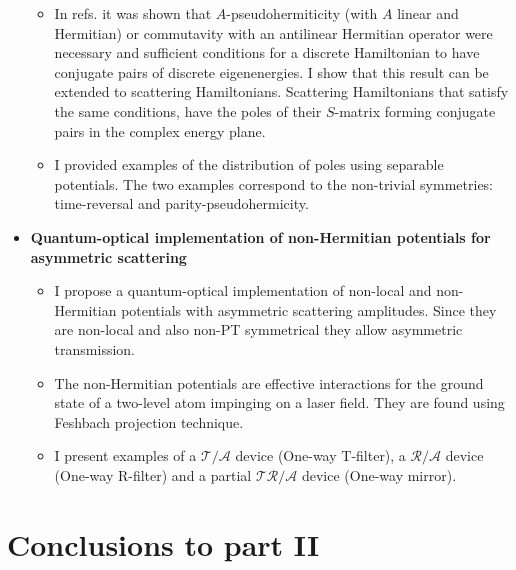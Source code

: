 \begin{itemize}
\begin{itemize}
    \item In refs. \cite{Mostafazadeh2002,Mostafazadeh2002a,Mostafazadeh2002b} it was shown that
    $A$-pseudohermiticity (with $A$ linear and Hermitian) or commutavity with an antilinear Hermitian operator were necessary and sufficient conditions for a discrete Hamiltonian to have conjugate pairs of discrete eigenenergies. I show that this result can be extended to scattering Hamiltonians. Scattering Hamiltonians that satisfy the same conditions, have the poles of their $S$-matrix forming conjugate pairs in the complex energy plane.

    \item I provided examples of the distribution of poles using separable potentials. The two examples correspond to the non-trivial symmetries: time-reversal and parity-pseudohermicity.

  \end{itemize}

  \item {\bf Quantum-optical implementation of non-Hermitian potentials for asymmetric scattering}
  \begin{itemize}
    \item I propose a quantum-optical implementation of non-local and non-Hermitian potentials
    with asymmetric scattering amplitudes. Since they are non-local and also non-PT symmetrical they allow asymmetric transmission.

    \item The non-Hermitian potentials are effective interactions for the ground state of a two-level atom impinging on a laser field. They are found using Feshbach projection technique.

    \item I present examples of a $\mathcal{T/A}$ device (One-way T-filter), a $\mathcal{R/A}$ device (One-way R-filter) and a partial $\mathcal{TR/A}$ device (One-way mirror).

  \end{itemize}

\end{itemize}

\section*{Conclusions to part II}

